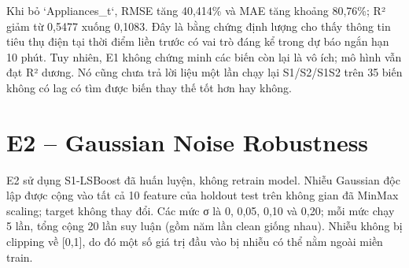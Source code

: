 Khi bỏ `Appliances\_t`, RMSE tăng 40,414\% và MAE tăng khoảng 80,76\%; R² giảm từ 0,5477 xuống 0,1083. Đây là bằng chứng định lượng cho thấy thông tin tiêu thụ điện tại thời điểm liền trước có vai trò đáng kể trong dự báo ngắn hạn 10 phút. Tuy nhiên, E1 không chứng minh các biến còn lại là vô ích; mô hình vẫn đạt R² dương. Nó cũng chưa trả lời liệu một lần chạy lại S1/S2/S1S2 trên 35 biến không có lag có tìm được biến thay thế tốt hơn hay không.

\section{E2 -- Gaussian Noise Robustness}\label{e2-gaussian-noise-robustness}

E2 sử dụng S1-LSBoost đã huấn luyện, không retrain model. Nhiễu Gaussian độc lập được cộng vào tất cả 10 feature của holdout test trên không gian đã MinMax scaling; target không thay đổi. Các mức σ là 0, 0,05, 0,10 và 0,20; mỗi mức chạy 5 lần, tổng cộng 20 lần suy luận (gồm năm lần clean giống nhau). Nhiễu không bị clipping về {[}0,1{]}, do đó một số giá trị đầu vào bị nhiễu có thể nằm ngoài miền train.

